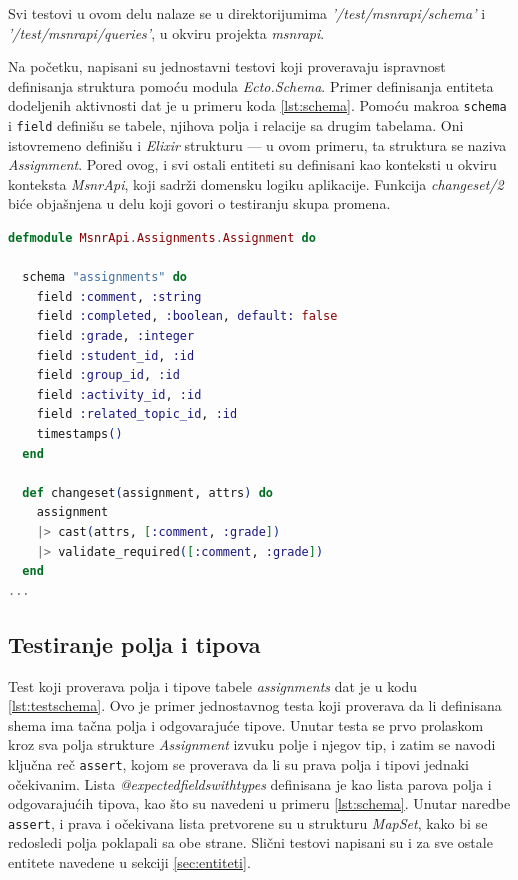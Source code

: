 \documentclass[12pt,oneside]{memoir}
\begin{document}
\par Svi testovi u ovom delu nalaze se u direktorijumima \textit{'/test/msnr{\textunderscore}api/schema'} i \textit{'/test/msnr{\textunderscore}api/queries'}, u okviru projekta \emph{msnr{\textunderscore}api}. 
\par Na početku, napisani su jednostavni testovi koji proveravaju ispravnost definisanja struktura pomoću modula \emph{Ecto.Schema}. Primer definisanja entiteta dodeljenih aktivnosti  dat je u primeru koda \ref{lst:schema}. Pomoću makroa \texttt{schema} i \texttt{field} definišu se tabele, njihova polja i relacije sa drugim tabelama. Oni istovremeno definišu i \emph{Elixir} strukturu --- u ovom primeru, ta struktura se naziva \emph{Assignment}. Pored ovog, i svi ostali entiteti su definisani kao konteksti u okviru konteksta \emph{MsnrApi}, koji sadrži domensku logiku aplikacije. Funkcija \emph{changeset/2} biće objašnjena u delu koji govori o testiranju skupa promena. \\

\begin{minipage}{\linewidth}
\begin{lstlisting}[language=elixir, basicstyle=\small, caption={Shema tabele \emph{assignments}},captionpos=b, label={lst:schema}]
defmodule MsnrApi.Assignments.Assignment do
  
  schema "assignments" do
    field :comment, :string
    field :completed, :boolean, default: false
    field :grade, :integer
    field :student_id, :id
    field :group_id, :id
    field :activity_id, :id
    field :related_topic_id, :id
    timestamps()
  end

  def changeset(assignment, attrs) do
    assignment
    |> cast(attrs, [:comment, :grade])
    |> validate_required([:comment, :grade])
  end
...
\end{lstlisting}
\end{minipage}

\vspace*{2\baselineskip}

\subsection{Testiranje polja i tipova}
\par Test koji proverava polja i tipove tabele \emph{assignments} dat je u kodu \ref{lst:testschema}. Ovo je primer jednostavnog testa koji proverava da li definisana shema ima tačna polja i odgovarajuće tipove. Unutar testa se prvo prolaskom kroz sva polja strukture \emph{Assignment} izvuku polje i njegov tip, i zatim se navodi ključna reč \texttt{assert}, kojom se proverava da li su prava polja i tipovi jednaki očekivanim. Lista \emph{@expected{\textunderscore}fields{\textunderscore}with{\textunderscore}types} definisana je kao lista parova polja i odgovarajućih tipova, kao što su navedeni u primeru \ref{lst:schema}. Unutar naredbe \texttt{assert}, i prava i očekivana lista pretvorene su u strukturu \emph{MapSet}, kako bi se redosledi polja poklapali sa obe strane. Slični testovi napisani su i za sve ostale entitete navedene u sekciji \ref{sec:entiteti}. \\
\end{document}

